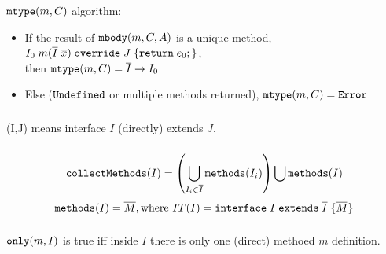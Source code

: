 \subsubsection{\mostSpecific}

\subsubsection{\mtype}
$\texttt{mtype}(m, C)$ algorithm:
\begin{itemize}
	\item If the result of $\texttt{mbody}(m, C, A)$ is a unique method,\\
	$I_0 \; m (\overline{I} \; \overline{x}) \; \texttt{override} \; J \; {\{} \texttt{return} \; e_0 ; {\}}$,\\
	then $\texttt{mtype}(m, C) = \overline{I} \to I_0$
	\item Else ($\texttt{Undefined}$ or multiple methods returned), $\texttt{mtype}(m, C) = \texttt{Error}$
\end{itemize}



\subsubsection{\ext}
\ext(I,J) means interface $I$ (directly) extends $J$.



\subsubsection{\collectMethods}
\[ \texttt{collectMethods}(I) = \left( \bigcup_{I_i \in \overline{I}} \texttt{methods}(I_i) \right) \bigcup \texttt{methods}(I) \]
\[ \texttt{methods}(I) = \overline{M}, \text{where } IT(I) = \texttt{interface} \; I \; \texttt{extends} \; \overline{I} \; {\{} \overline{M} {\}} \]



\subsubsection{\needed}

\subsubsection{\only}
$\texttt{only}(m, I)$ is true iff inside $I$ there is only one (direct) methoed $m$ definition.


